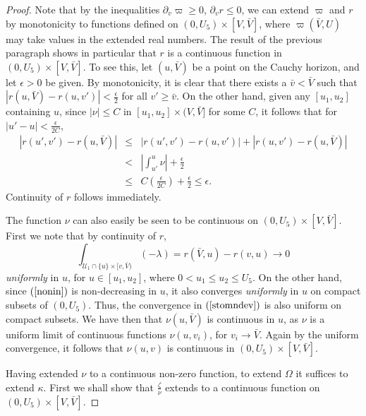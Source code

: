 \documentclass{article}
\begin{document}
{\begin{proof}
Note that by the inequalities $\partial_v\varpi\ge0$, 
$\partial_vr\le0$, we can extend
$\varpi$ and $r$ by monotonicity to functions
defined on $(0,U_5)\times[V,\bar{V}]$, where
$\varpi(\bar{V},U)$ may take values in the
extended real numbers. 
The result of the previous paragraph shows in particular
that $r$ is
a continuous function in $(0,U_5)\times[V,\bar{V}]$.
To see this, let $(u,\bar{V})$ be a point on the Cauchy
horizon, and let $\epsilon>0$ be given. By monotonicity,
it is clear that there exists a $\bar{v}<\bar{V}$ such that
$|r(u,\bar{V})-r(u,v')|<\frac{\epsilon}2$ for all $v'\ge\bar{v}$. 
On the other hand, given any $[u_1,u_2]$ containing $u$,
since $|\nu|\le C$ in $[u_1,u_2]\times(V,\bar{V}]$ for some $C$,
it follows that for $|u'-u|<\frac{\epsilon}{2C}$,
\begin{eqnarray*}
|r(u',v')-r(u,\bar{V})|&\le&|r(u',v')-r(u,v')|+|r(u,v')-r(u,\bar{V})|\\
&<&\left|\int_{u'}^u{\nu}\right|+\frac{\epsilon}2\\
&\le&C\left(\frac{\epsilon}{2C}\right)+\frac\epsilon2\le\epsilon.
\end{eqnarray*}
Continuity of $r$ follows immediately.

The function $\nu$ can also easily be seen to
be continuous on $(0,U_5)\times[V,\bar{V}]$.
First we note that by continuity of $r$,
\[
\int_{\mathcal{U}_1\cap\{u\}\times[v,\bar{V})}(-\lambda)=r(\bar{V},u)-r(v,u)\to0
\]
\emph{uniformly} in $u$, for $u\in [u_1,u_2]$, where $0<u_1\le u_2\le U_5$.
On the other hand, since $(\ref{nonin})$ is non-decreasing in $u$, it also
converges \emph{uniformly} in $u$ on compact subsets of $(0, U_5)$. Thus, the
convergence in $(\ref{stomndev})$ is also uniform on compact subsets. 
We have then that $\nu(u,\bar{V})$ is continuous in $u$, as $\nu$ is a uniform limit
of continuous functions $\nu(u,v_i)$, for $v_i\to\bar{V}$.
Again by the uniform convergence, it follows that $\nu(u,v)$ is
continuous in $(0,U_5)\times[V,\bar{V}]$.


Having extended $\nu$ to a continuous non-zero function,
to extend $\Omega$ it suffices to extend $\kappa$.
First we shall show that $\frac{\zeta}{\nu}$
extends to a continuous function on $(0,U_5)\times[V,\bar{V}]$.


\end{proof}}
\end{document}
